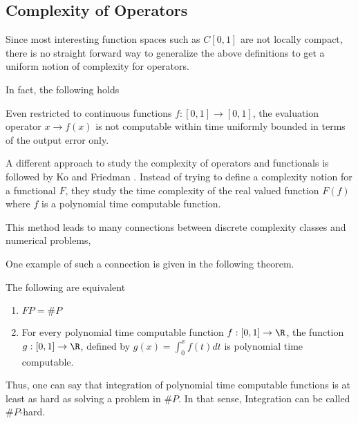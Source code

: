 	\subsection{Complexity of Operators}
		Since most interesting function spaces such as $C[0,1]$ are not locally compact,
		there is no straight forward way to generalize the above definitions to get
    a uniform notion of complexity for operators.

		In fact, the following holds
		\begin{theorem}
      Even restricted to continuous functions $f: [0,1] \to [0,1]$, the
      evaluation operator $x \to f(x)$ is not computable within time uniformly
      bounded in terms of the output error only.  
    \end{theorem}

	  A different approach to study the complexity of operators and functionals
    is followed by Ko and Friedman \cite{KoBook}.
    Instead of trying to define a complexity notion for a functional $F$, they
    study the time complexity of the real valued function $F(f)$ where $f$ is a
    polynomial time computable function.


		This  method leads to many connections between discrete complexity classes
    and numerical problems,

    One example of such a connection is given in the following theorem.
		\begin{theorem}
			The following are equivalent
			\begin{enumerate}
				\item $FP = \#P$
				\item For every polynomial time computable function $f: [0,1] \to \R$, the function
					$g: [0,1] \to \R$, defined by $g(x) = \int_0^x f(t) dt$ is polynomial time computable.
			\end{enumerate} 
		\end{theorem}
		Thus, one can say that integration of polynomial time computable functions is at
    least as hard as solving a problem in $\#P$.
    In that sense, Integration can be called $\#P$-hard.

